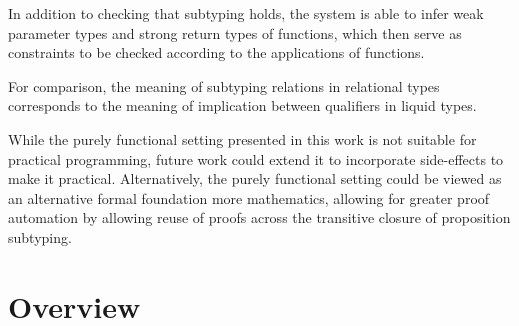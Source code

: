 \documentclass[acmsmall]{acmart}
\theoremstyle{definition}
\begin{document}
In addition to checking that subtyping holds, the system is able to infer weak 
parameter types and strong return types of functions, which then serve as constraints
to be checked according to the applications of functions.

For comparison, the meaning of subtyping relations in relational types corresponds 
to the meaning of implication between qualifiers in liquid types.

While the purely functional setting presented in this work is not suitable for practical programming,
future work could extend it to incorporate side-effects to make it practical.
Alternatively, the purely functional setting could be viewed as an alternative formal foundation more
mathematics, allowing for greater proof automation by allowing reuse of proofs across the transitive closure of 
proposition subtyping.



\section{Overview}




\end{document}
